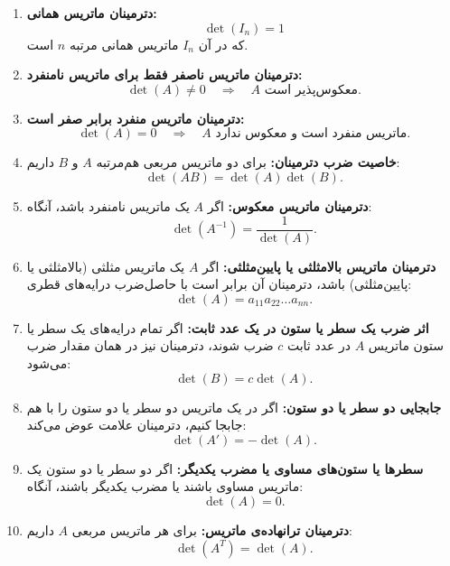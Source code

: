 	\begin{enumerate}
		\item \textbf{دترمینان ماتریس همانی:} 
		\[
		\det(I_n) = 1
		\]
		که در آن $I_n$ ماتریس همانی مرتبه $n$ است.
		
		\item \textbf{دترمینان ماتریس ناصفر فقط برای ماتریس نامنفرد:}
		\[
		\det(A) \neq 0 \quad \Rightarrow \quad A \text{ معکوس‌پذیر است.}
		\]
		
		\item \textbf{دترمینان ماتریس منفرد برابر صفر است:}
		\[
		\det(A) = 0 \quad \Rightarrow \quad A \text{ ماتریس منفرد است و معکوس ندارد.}
		\]
		
		\item \textbf{خاصیت ضرب دترمینان:}
		برای دو ماتریس مربعی هم‌مرتبه $A$ و $B$ داریم:
		\[
		\det(AB) = \det(A) \det(B).
		\]
		
		\item \textbf{دترمینان ماتریس معکوس:}
		اگر $A$ یک ماتریس نامنفرد باشد، آنگاه:
		\[
		\det(A^{-1}) = \frac{1}{\det(A)}.
		\]
		
		\item \textbf{دترمینان ماتریس بالامثلثی یا پایین‌مثلثی:}
		اگر $A$ یک ماتریس مثلثی (بالامثلثی یا پایین‌مثلثی) باشد، دترمینان آن برابر است با حاصل‌ضرب درایه‌های قطری:
		\[
		\det(A) = a_{11} a_{22} \dots a_{nn}.
		\]
		
		\item \textbf{اثر ضرب یک سطر یا ستون در یک عدد ثابت:}
		اگر تمام درایه‌های یک سطر یا ستون ماتریس $A$ در عدد ثابت $c$ ضرب شوند، دترمینان نیز در همان مقدار ضرب می‌شود:
		\[
		\det(B) = c \det(A).
		\]
		
		\item \textbf{جابجایی دو سطر یا دو ستون:}
		اگر در یک ماتریس دو سطر یا دو ستون را با هم جابجا کنیم، دترمینان علامت عوض می‌کند:
		\[
		\det(A') = -\det(A).
		\]
		
		\item \textbf{سطرها یا ستون‌های مساوی یا مضرب یکدیگر:}
		اگر دو سطر یا دو ستون یک ماتریس مساوی باشند یا مضرب یکدیگر باشند، آنگاه:
		\[
		\det(A) = 0.
		\]
		
		\item \textbf{دترمینان ترانهاده‌ی ماتریس:}
		برای هر ماتریس مربعی $A$ داریم:
		\[
		\det(A^T) = \det(A).
		\]
		
	\end{enumerate}
		
			
